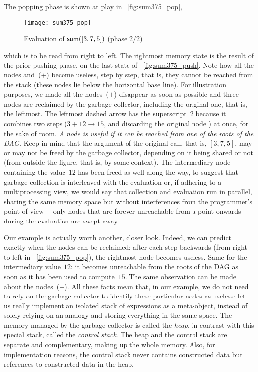 The popping phase is shown at play in \fig~\vref{fig:sum375_pop},
\begin{figure}[b]
\centering
\texttt{[image: sum375\_pop]}
\caption{Evaluation of \(\textsf{sum}([3,7,5])\) (phase 2/2)
\label{fig:sum375_pop}}
\end{figure}
which is to be read from right to left. The rightmost memory state is
the result of the prior pushing phase, on the last state of
\fig~\ref{fig:sum375_push}. Note how all the nodes 
and~(\(+\)) become useless, step by step, that is, they cannot be
reached from the stack (these nodes lie below the horizontal base
line). For illustration purposes, we made all the nodes~(\(+\))
disappear as soon as possible and three nodes  are reclaimed
by the garbage collector, including the original one, that is, the
leftmost. The leftmost dashed arrow has the superscript~\(2\) because
it combines two steps (\(3+12 \rightarrow 15\), and discarding the
original node ) at once, for the sake of room. \emph{A node
  is useful if it can be reached from one of the roots of the DAG.}
Keep in mind that the argument of the original call, that is,
\([3,7,5]\), may or may not be freed by the garbage collector,
depending on it being shared or not (from outside the figure, that is,
by some context). The intermediary node containing the value~\(12\)
has been freed as well along the way, to suggest that garbage
collection is interleaved with the evaluation or, if adhering to a
multiprocessing view, we would say that collection and evaluation run
in parallel, sharing the same memory space but without interferences
from the programmer's point of view --~only nodes that are forever
unreachable from a point onwards during the evaluation are swept away.

Our example is actually worth another, closer look. Indeed, we can
predict exactly when the nodes  can be reclaimed: after each
step backwards (from right to left in \fig~\vref{fig:sum375_pop}), the
rightmost node  becomes useless. Same for the intermediary
value~\(12\): it becomes unreachable from the roots of the DAG as soon
as it has been used to compute~\(15\). The same observation can be
made about the nodes~(\(+\)). All these facts mean that, in our
example, we do not need to rely on the garbage collector to identify
these particular nodes as useless: let us really implement an isolated
stack of expressions as a meta\hyp{}object, instead of solely relying
on an analogy and storing everything in the same space. The memory
managed by the garbage collector is called the \emph{heap}, in
contrast with this special stack, called the \emph{control stack}. The
heap and the control stack are separate and complementary, making up
the whole memory. Also, for implementation reasons, the control stack
never contains constructed data but references to constructed data in
the heap.

